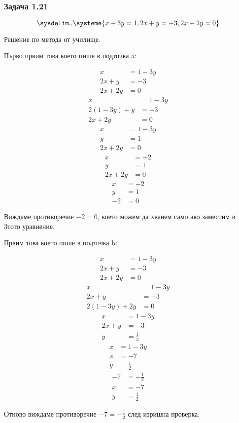 \documentclass{subfiles}
\begin{document}
\subsubsection{Задача 1.21}

\begin{equation*}
    \sysdelim..\systeme{
        x + 3y = 1,
        2x + y = -3,
        2x + 2y = 0
    }
\end{equation*}

\noindent Решение по метода от училище.

\noindent Първо првим това което пише в подточка a:

\begin{align*}
    x &= 1 - 3y \\
    2x + y &= -3 \\
    2x + 2y &= 0
\end{align*}
\begin{align*}
    x &= 1 - 3y \\
    2(1 - 3y) + y &= -3 \\
    2x + 2y &= 0
\end{align*}
\begin{align*}
    x &= 1 - 3y \\
    y &= 1 \\
    2x + 2y &= 0
\end{align*}
\begin{align*}
    x &= -2 \\
    y &= 1 \\
    2x + 2y &= 0
\end{align*}
\begin{align*}
    x &= -2 \\
    y &= 1 \\
    -2 &= 0
\end{align*}

\noindent Виждаме противоречие $-2=0$, което можем да хванем само ако заместим в 3тото уравнение.

\noindent Првим това което пише в подточка b:

\begin{align*}
    x &= 1 - 3y \\
    2x + y &= -3 \\
    2x + 2y &= 0
\end{align*}
\begin{align*}
    x &= 1 - 3y \\
    2x + y &= -3 \\
    2(1 - 3y) + 2y &= 0
\end{align*}
\begin{align*}
    x &= 1 - 3y \\
    2x + y &= -3 \\
    y &= \frac{1}{2}
\end{align*}
\begin{align*}
    x &= 1 - 3y \\
    x &= -7 \\
    y &= \frac{1}{2}
\end{align*}
\begin{align*}
    -7 &= - \frac{1}{2} \\
    x &= -7 \\
    y &= \frac{1}{2}
\end{align*}

\noindent Отново виждаме противоречие $-7 = - \frac{1}{2}$ след изришна проверка.
\end{document}
